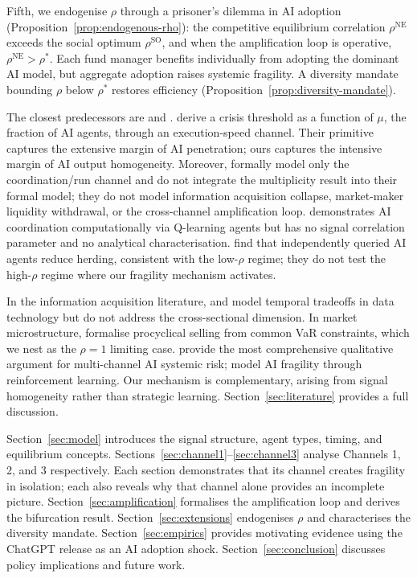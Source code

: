 Fifth, we endogenise $\rho$ through a prisoner's dilemma in AI adoption (Proposition~\ref{prop:endogenous-rho}): the competitive equilibrium correlation $\rho^{\text{NE}}$ exceeds the social optimum $\rho^{\text{SO}}$, and when the amplification loop is operative, $\rho^{\text{NE}} > \rho^*$. Each fund manager benefits individually from adopting the dominant AI model, but aggregate adoption raises systemic fragility. A diversity mandate bounding $\rho$ below $\rho^*$ restores efficiency (Proposition~\ref{prop:diversity-mandate}).

The closest predecessors are \citet{danielsson2025} and \citet{yang2024}. \citet{danielsson2025} derive a crisis threshold as a function of $\mu$, the fraction of AI agents, through an execution-speed channel. Their primitive captures the extensive margin of AI penetration; ours captures the intensive margin of AI output homogeneity. Moreover, \citet{danielsson2025} formally model only the coordination/run channel and do not integrate the \citet{hellwig2002} multiplicity result into their formal model; they do not model information acquisition collapse, market-maker liquidity withdrawal, or the cross-channel amplification loop. \citet{yang2024} demonstrates AI coordination computationally via Q-learning agents but has no signal correlation parameter and no analytical characterisation. \citet{hansen2025} find that independently queried AI agents reduce herding, consistent with the low-$\rho$ regime; they do not test the high-$\rho$ regime where our fragility mechanism activates.

In the information acquisition literature, \citet{dugast2018} and \citet{farboodi2020} model temporal tradeoffs in data technology but do not address the cross-sectional dimension. In market microstructure, \citet{danielsson2012} formalise procyclical selling from common VaR constraints, which we nest as the $\rho = 1$ limiting case. \citet{danielsson2022} provide the most comprehensive qualitative argument for multi-channel AI systemic risk; \citet{dou2025a, dou2025b} model AI fragility through reinforcement learning. Our mechanism is complementary, arising from signal homogeneity rather than strategic learning. Section~\ref{sec:literature} provides a full discussion.

Section~\ref{sec:model} introduces the signal structure, agent types, timing, and equilibrium concepts. Sections~\ref{sec:channel1}--\ref{sec:channel3} analyse Channels 1, 2, and 3 respectively. Each section demonstrates that its channel creates fragility in isolation; each also reveals why that channel alone provides an incomplete picture. Section~\ref{sec:amplification} formalises the amplification loop and derives the bifurcation result. Section~\ref{sec:extensions} endogenises $\rho$ and characterises the diversity mandate. Section~\ref{sec:empirics} provides motivating evidence using the ChatGPT release as an AI adoption shock. Section~\ref{sec:conclusion} discusses policy implications and future work.
